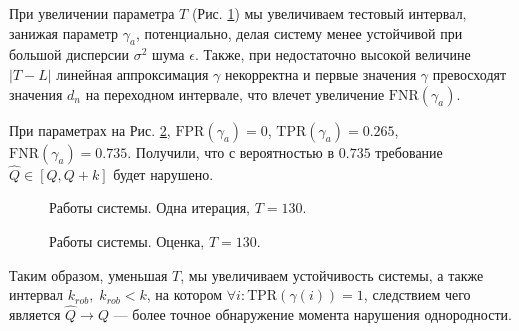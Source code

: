 \documentclass[specialist, substylefile = spbu.rtx,
			   subf, href, 12pt]{disser}
\begin{document}
\newpage
При увеличении параметра $ T $ (Рис. \ref{pic:system_estimation_one_iter_t=130}) мы увеличиваем тестовый интервал, занижая параметр $ \gamma_a $, потенциально, делая систему менее устойчивой при большой дисперсии $ \sigma^2 $ шума $ \epsilon $. Также, при недостаточно высокой величине $ |T - L| $ линейная аппроксимация $ \gamma $ некорректна и первые значения $ \gamma $ превосходят значения $ d_n $ на переходном интервале, что влечет увеличение $ \mathrm{FNR}(\gamma_a) $.

При параметрах на Рис. \ref{pic:system_estimation_t=130}, $ \mathrm{FPR}(\gamma_a) = 0 $, $ \mathrm{TPR}(\gamma_a) = 0.265 $, $ \mathrm{FNR}(\gamma_a) = 0.735 $. Получили, что с вероятностью в $ 0.735 $ требование $ \hat{Q} \in [Q, Q+k] $ будет нарушено.


\begin{figure}[!hhh]
	\caption{Работы системы. Одна итерация, $ T = 130 $.}
	\label{pic:system_estimation_one_iter_t=130}
\end{figure}

\begin{figure}[!hhh]
	\caption{Работы системы. Оценка, $ T = 130 $.}
	\label{pic:system_estimation_t=130}
\end{figure}

\newpage
Таким образом, уменьшая $ T $, мы увеличиваем устойчивость системы, а также интервал $ k_{rob}, \; k_{rob} < k $, на котором $ \forall i: \mathrm{TPR}(\gamma(i)) = 1 $, следствием чего является $ \hat{Q} \rightarrow Q $ --- более точное обнаружение момента нарушения однородности.
\end{document}
